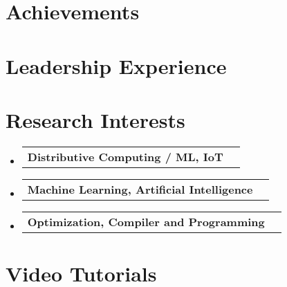 \documentclass[letterpaper,11pt]{article}
\makeatletter
\newcommand{\resumeSubheadingClear}[1]{
    \vspace{-2pt}\item
    \begin{tabular*}{0.97\textwidth}[t]{l@{\extracolsep{\fill}}r}
        \textbf{#1}
    \end{tabular*}\vspace{-7pt}
}
\newcommand{\resumeSubHeadingListStart}{\begin{itemize}[leftmargin=0.15in, label={}]}
\newcommand{\resumeSubHeadingListEnd}{\end{itemize}}
\makeatother
\begin{document}
\section{Achievements}
\begin{itemize}[leftmargin=0.15in, label={}]
    \small{\item{
                    
                    
                    
                    
                    
                    
              }}
\end{itemize}

\section{Leadership Experience
 }
\resumeSubHeadingListStart


\resumeSubHeadingListEnd

\section{Research Interests}
\resumeSubHeadingListStart
\resumeSubheadingClear
{Distributive Computing / ML, IoT}

\resumeSubheadingClear
{Machine Learning, Artificial Intelligence}

\resumeSubheadingClear
{Optimization, Compiler and Programming}

\resumeSubHeadingListEnd

\section{Video Tutorials}
\begin{itemize}[leftmargin=0.15in, label={}]
    \small{\item{
                    
                    
                    
              }}
\end{itemize}
\end{document}
